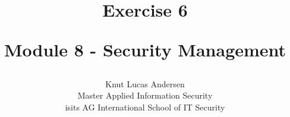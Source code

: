 \title{ 
	\begin{center} \textbf{ Exercise 6 } \end{center}
	\begin{center} {\large Module 8 - Security Management } \end{center}
}

\author{ 
	Knut Lucas Andersen \\
	Master Applied Information Security \\
	isits AG International School of IT Security
}